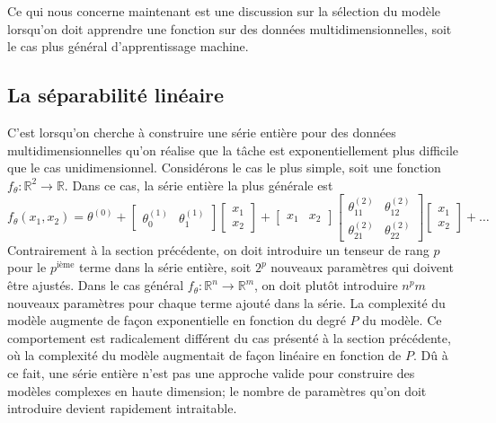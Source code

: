 Ce qui nous concerne maintenant est une discussion sur la sélection du modèle lorsqu'on doit apprendre 
une fonction sur des données multidimensionnelles, soit le cas plus général d'apprentissage machine.


\subsection{La séparabilité linéaire}
C'est lorsqu'on cherche à construire une série entière pour des données multidimensionnelles qu'on réalise que la tâche 
est exponentiellement plus difficile que le cas unidimensionnel. Considérons le cas le plus simple, soit une fonction 
$f_\theta : \mathbb{R}^2 \rightarrow \mathbb{R}$. Dans ce cas, la série entière la plus générale est
\begin{equation}\label{eq:multidim expansion}
        f_\theta(x_1, x_2) = \theta^{(0)} 
        + 
        \begin{bmatrix}
                \theta^{(1)}_0 & \theta^{(1)}_1 
        \end{bmatrix}
        \begin{bmatrix}
               x_1 \\
               x_2
        \end{bmatrix}
        +
        \begin{bmatrix}
                x_1 & x_2 
        \end{bmatrix}
        \begin{bmatrix}
                \theta^{(2)}_{11} & \theta^{(2)}_{12} \\
                \theta^{(2)}_{21} & \theta^{(2)}_{22}
        \end{bmatrix}
        \begin{bmatrix}
                x_1 \\ x_2
        \end{bmatrix}
        + \dots
\end{equation} 
Contrairement à la section précédente, on doit introduire un tenseur de rang $p$ pour le $p^{\text{ième}}$ terme dans la série entière, 
soit $2^p$ nouveaux paramètres qui doivent être ajustés. Dans le cas général $f_\theta: \mathbb{R}^n \rightarrow \mathbb{R}^m$,
on doit plutôt introduire $n^pm$ nouveaux paramètres pour chaque terme ajouté dans la série. 
La complexité du modèle augmente de façon exponentielle en fonction du degré $P$ du modèle.
Ce comportement est radicalement différent du cas présenté à la section précédente, où la complexité du modèle augmentait de façon linéaire en fonction de $P$. 
Dû à ce fait, une série entière n'est pas une approche valide pour construire des modèles complexes en haute dimension; 
le nombre de paramètres qu'on doit introduire devient rapidement intraitable.

